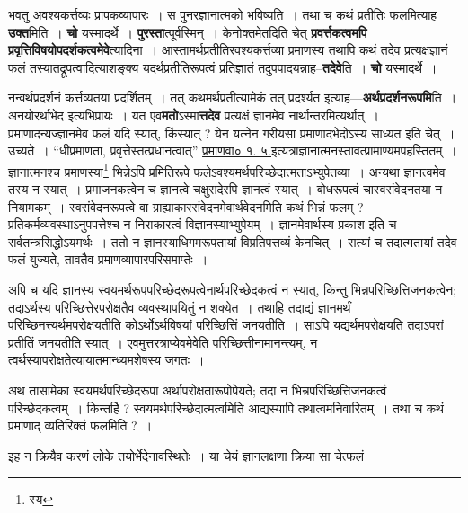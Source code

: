 \documentclass[article,12pt,a4paper]{memoir}
\begin{document}
	  \pstart भवतु अवश्यकर्त्तव्यः प्रापकव्यापारः । स पुनरज्ञानात्मको भविष्यति । तथा च कथं प्रतीतिः फलमित्याह \textbf{उक्त}मिति । \textbf{चो} यस्मादर्थे । \textbf{पुरस्ता}त्पूर्वस्मिन् । केनोक्तमेतदिति चेत् \textbf{प्रवर्त्तकत्वमपि प्रवृत्तिविषयोपदर्शकत्वमेवे}त्यादिना । आस्तामर्थप्रतीतिरवश्यकर्त्तव्या प्रमाणस्य तथापि कथं तदेव प्रत्यक्षज्ञानं फलं तस्यातद्रूपत्वादित्याशङ्क्य यदर्थप्रतीतिरूपत्वं प्रतिज्ञातं तदुपपादयन्नाह--\textbf{तदेवे}ति । \textbf{चो} यस्मादर्थे ।
	\pend
      

	  \pstart नन्वर्थप्रदर्शनं कर्त्तव्यतया प्रदर्शितम् । तत् कथमर्थप्रतीत्यामेकं तत् प्रदर्श्यत इत्याह—\textbf{अर्थप्रदर्शनरूपमि}ति । अनयोरर्थाभेद इत्यभिप्रायः । यत एव\textbf{मतो}ऽस्मा\textbf{त्तदेव} प्रत्यक्षं ज्ञानमेव नार्थान्तरमित्यर्थात् । प्रमाणादन्यज्ज्ञानमेव फलं यदि स्यात्, किंस्यात् ? येन यत्नेन गरीयसा प्रमाणादभेदोऽस्य साध्यत इति चेत् । उच्यते । “धीप्रमाणता, प्रवृत्तेस्तत्प्रधानत्वात्” \href{http://http://sarit.indology.info/?cref=pv.1.5}{प्रमाणवा०
	    १. ५.}इत्यत्राज्ञानात्मनस्तावत्प्रामाण्यमपहस्तितम् । ज्ञानात्मनश्च प्रमाणस्या\footnote{स्य} भिन्नेऽपि प्रमितिरूपे फलेऽवश्यमर्थपरिच्छेदात्मताऽभ्युपेतव्या । अन्यथा ज्ञानत्वमेव तस्य न स्यात् । प्रमाजनकत्वेन च ज्ञानत्वे चक्षुरादेरपि ज्ञानत्वं स्यात् । बोधरूपत्वं चास्वसंवेदनतया न नियामकम् । स्वसंवेदनरूपत्वे वा ग्राह्याकारसंवेदनमेवार्थवेदनमिति कथं भिन्नं फलम् ? प्रतिकर्मव्यवस्थाऽनुपपत्तेश्च न निराकारत्वं विज्ञानस्याभ्युपेयम् । ज्ञानमेवार्थस्य प्रकाश इति च सर्वतन्त्रसिद्धोऽयमर्थः । ततो न ज्ञानस्याधिगमरूपतायां विप्रतिपत्तव्यं केनचित् । सत्यां च तदात्मतायां तदेव फलं युज्यते, तावतैव प्रमाणव्यापारपरिसमाप्तेः ।
	\pend
      

	  \pstart अपि च यदि ज्ञानस्य स्वयमर्थरूपपरिच्छेदरूपत्वेनार्थपरिच्छेदकत्वं न स्यात्, किन्तु भिन्नपरिच्छित्तिजनकत्वेन; तदाऽर्थस्य परिच्छित्तेरपरोक्षतैव व्यवस्थापयितुं न शक्येत । तथाहि तदाद्यं ज्ञानमर्थं परिच्छिनत्त्यर्थमपरोक्षयतीति कोऽर्थोऽर्थविषयां परिच्छित्तिं जनयतीति । साऽपि यद्यर्थमपरोक्षयति तदाऽपरां प्रतीतिं जनयतीति स्यात् । एवमुत्तरत्राप्येवमेवेति परिच्छित्तीनामानन्त्यम्, न त्वर्थस्यापरोक्षतेत्यायातमान्ध्यमशेषस्य जगतः ।
	\pend
      

	  \pstart अथ तासामेका स्वयमर्थपरिच्छेदरूपा अर्थापरोक्षतारूपोपेयते; तदा न भिन्नपरिच्छित्तिजनकत्वं परिच्छेदकत्वम् । किन्तर्हि ? स्वयमर्थपरिच्छेदात्मत्वमिति आद्यस्यापि तथात्वमनिवारितम् । तथा च कथं प्रमाणाद् व्यतिरिक्तं फलमिति ? ।
	\pend
      

	  \pstart इह न क्रियैव करणं लोके तयोर्भेदेनावस्थितेः । या चेयं ज्ञानलक्षणा क्रिया सा चेत्फलं
	\pend
      \leavevmode{}
	  \bigskip
	  \begingroup
	
\end{document}
